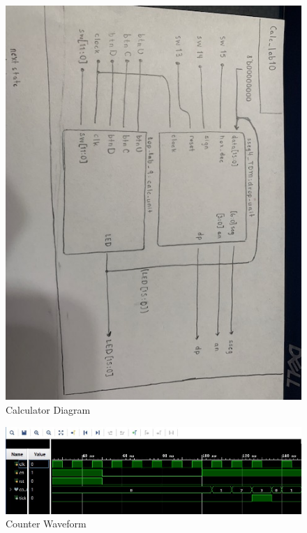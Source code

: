 \documentclass[11pt]{article}
\begin{document}
\begin{figure}[ht]\centering	
	
	\includegraphics[width=1\textwidth,angle=0,origin=c]{Calculator}
	\caption{Calculator Diagram}
	\label{fig:sim_with_table}
\end{figure}

\begin{figure}[ht]\centering	
	
	\includegraphics[width=1\textwidth,angle=0,origin=c]{Counter Waveform}
	\caption{Counter Waveform}
	\label{fig:sim_with_table}
\end{figure}
\end{document}
